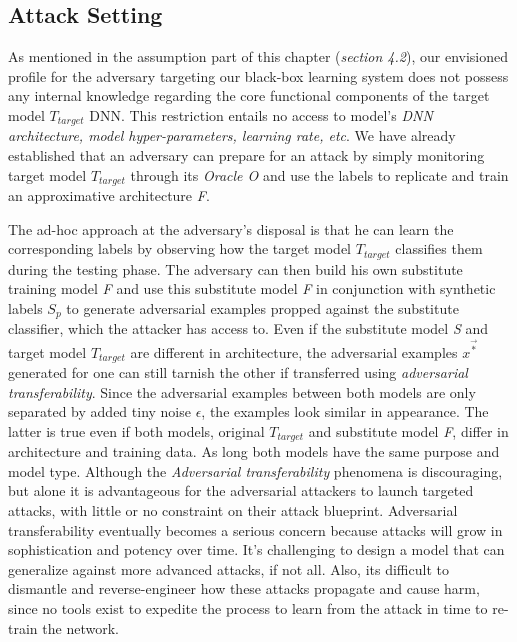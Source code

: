 \documentclass[grad,lot,lof,11pt,oneside,onehalfspace]{RUthesis}
\begin{document}
\subsection{Attack Setting}
As mentioned in the assumption part of this chapter (\textit{section 4.2}), our envisioned profile for the adversary targeting our black-box learning system does not possess any internal knowledge regarding the core functional components of the target model \textit{$T_{target}$} DNN. This restriction entails no access to model's \textit{DNN architecture, model hyper-parameters, learning rate, etc}. We have already established that an adversary can prepare for an attack by simply monitoring target model \textit{$T_{target}$} through its \textit{Oracle O} and use the labels to replicate and train an approximative architecture \textit{F}. 

The ad-hoc approach at the adversary's disposal is that he can learn the corresponding labels by observing how the target model \textit{$T_{target}$} classifies them during the testing phase. The adversary can then build his own substitute training model \textit{F} and use this substitute model \textit{F} in conjunction with synthetic labels \textit{$S_{p}$} to generate adversarial examples propped against the substitute classifier, which the attacker has access to. Even if the substitute model \textit{S} and target model \textit{$T_{target}$} are different in architecture, the adversarial examples $x^{\vec{*}}$ generated for one can still tarnish the other if transferred using \textit{adversarial transferability}. Since the adversarial examples between both models are only separated by added tiny noise $\epsilon$, the examples look similar in appearance. The latter is true even if both models, original \textit{$T_{target}$} and substitute model \textit{F}, differ in architecture and training data. As long both models have the same purpose and model type. Although the \textit{Adversarial transferability} phenomena is discouraging,  but alone it is advantageous for the adversarial attackers to launch targeted attacks,  with little or no constraint on their attack blueprint. Adversarial transferability eventually becomes a serious concern because attacks will grow in sophistication and potency over time. It's challenging to design a model that can generalize against more advanced attacks, if not all. Also, its difficult to dismantle and reverse-engineer how these attacks propagate and cause harm, since no tools exist to expedite the process to learn from the attack in time to re-train the network.
\end{document}
